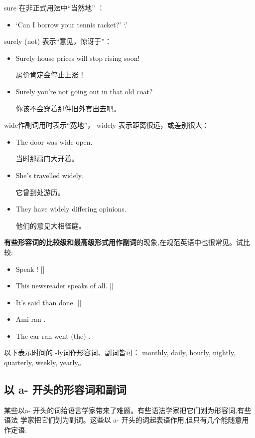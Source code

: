 sure 在非正式用法中“当然地” ：
\begin{itemize}
\item `Can I borrow your tennis racket?' `.'
\end{itemize}

surely (not) 表示“意见，惊讶于”：
\begin{itemize}
\item Surely house prices will stop rising soon!

  房价肯定会停止上涨！
\item Surely you're not going out in that old coat?

  你该不会穿着那件旧外套出去吧。
\end{itemize}

wide作副词用时表示“宽地”， widely 表示距离很远，或差别很大：
\begin{itemize}
\item The door was wide open.

  当时那扇门大开着。
\item She's travelled widely.

  它曾到处游历。
\item They have widely differing opinions.

  他们的意见大相径庭。
\end{itemize}


\textbf{有些形容词的比较级和最高级形式用作副词}的现象,在规范英语中也很常见。试比较:
\begin{itemize}
\item Speak ! []
\item This newsreader speaks  of all. []
\item It's  said than done. []
\item Ami ran .
\item The car ran went (the) .
\end{itemize}

以下表示时间的 -ly词作形容词、副词皆可： monthly, daily, hourly, nightly,
quarterly, weekly, yearly。

\subsection{以 a- 开头的形容词和副词}

某些以a- 开头的词给语言学家带来了难题。有些语法学家把它们划为形容词,有些语法
学家把它们划为副词。这些以 a- 开头的词起表语作用,但只有几个能随意用作定语.

